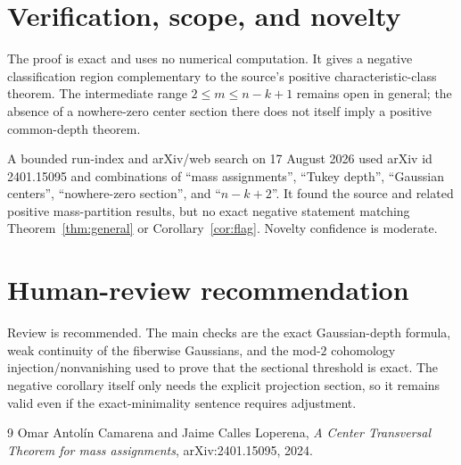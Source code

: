 \documentclass[11pt]{article}
\begin{document}
\section{Verification, scope, and novelty}

The proof is exact and uses no numerical computation.  It gives a negative
classification region complementary to the source's positive
characteristic-class theorem.  The intermediate range
$2\leq m\leq n-k+1$ remains open in general; the absence of a nowhere-zero
center section there does not itself imply a positive common-depth theorem.

A bounded run-index and arXiv/web search on 17 August 2026 used arXiv id
2401.15095 and combinations of ``mass assignments'', ``Tukey depth'',
``Gaussian centers'', ``nowhere-zero section'', and ``$n-k+2$''.  It found
the source and related positive mass-partition results, but no exact negative
statement matching Theorem~\ref{thm:general} or Corollary~\ref{cor:flag}.
Novelty confidence is moderate.

\section*{Human-review recommendation}

Review is recommended.  The main checks are the exact Gaussian-depth formula,
weak continuity of the fiberwise Gaussians, and the mod-$2$ cohomology
injection/nonvanishing used to prove that the sectional threshold is exact.
The negative corollary itself only needs the explicit projection section, so
it remains valid even if the exact-minimality sentence requires adjustment.

\begin{thebibliography}{9}
Omar Antol\'in Camarena and Jaime Calles Loperena,
\emph{A Center Transversal Theorem for mass assignments},
arXiv:2401.15095, 2024.
\end{thebibliography}
\end{document}
